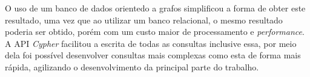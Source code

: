 \par O uso de um banco de dados orientedo a grafos simplificou a forma de obter este resultado, uma vez que ao utilizar um banco relacional, o mesmo resultado poderia ser obtido, porém com um custo maior de processamento e \textit{performance}. A API \textit{Cypher} facilitou a escrita de todas as consultas inclusive essa, por meio dela foi possível desenvolver consultas mais complexas como esta de forma mais rápida, agilizando o desenvolvimento da principal parte do trabalho.
